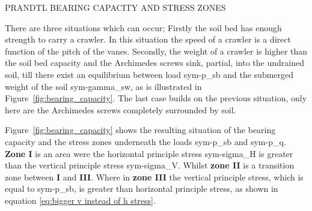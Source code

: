 \begin{RoyalFigure}[!htb, label=fig:bearing_capacity]{PRANDTL BEARING CAPACITY AND STRESS ZONES}
	\begin{center}
	\end{center}
\end{RoyalFigure}

There are three situations which can occur; Firstly the soil bed has enough strength to carry a crawler. In this
situation the speed of a crawler is a direct function of the pitch of the vanes. Secondly, the weight of a crawler is
higher than the soil bed capacity and the Archimedes screws sink, partial, into the undrained soil, till there exist an
equilibrium between load \gls{sym-p_sb} and the submerged weight of the soil \gls{sym-gamma_sw}, as is
illustrated in Figure~\ref{fig:bearing_capacity}. The last case builds on the previous situation, only here are the
Archimedes screws completely surrounded by soil.

Figure~\ref{fig:bearing_capacity} shows the resulting situation of the bearing capacity and the stress zones underneath
the loads \gls{sym-p_sb} and \gls{sym-p_q}. \textbf{Zone I} is an area were the horizontal principle stress
\gls{sym-sigma_H} is greater than the vertical principle stress \gls{sym-sigma_V}. Whilst \textbf{zone II} is a
transition zone between \textbf{I} and \textbf{III}. Where in \textbf{zone III} the vertical principle stress, which is
equal to \gls{sym-p_sb}, is greater than horizontal principle stress, as shown in equation \ref{eq:bigger v instead of h stress}.

